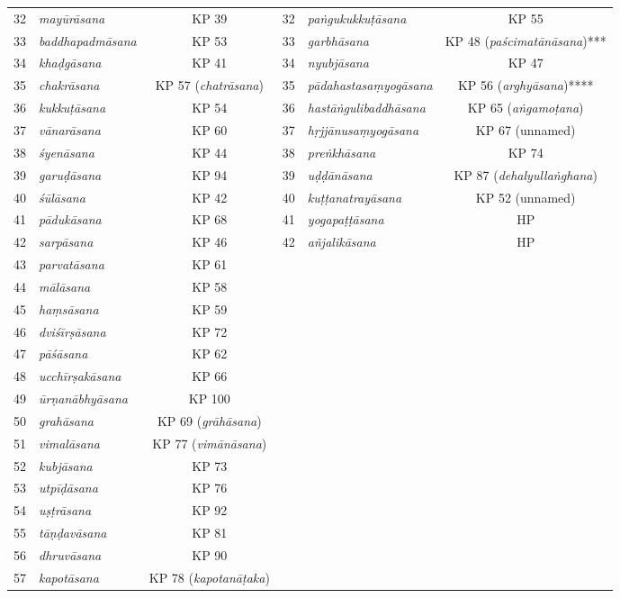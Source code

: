 \begin{longtable}{clcclc}
32 & \emph{mayūrāsana} & KP 39 & 32 & \emph{paṅgukukkuṭāsana} & KP 55 \\
33 & \emph{baddhapadmāsana} & KP 53 & 33 & \emph{garbhāsana} & KP 48 (\emph{paścimatānāsana})*** \\
34 & \emph{khaḍgāsana} & KP 41 & 34 & \emph{nyubjāsana} & KP 47 \\
35 & \emph{chakrāsana} & KP 57 (\emph{chatrāsana}) & 35 & \emph{pādahastasaṃyogāsana} & KP 56 (\emph{arghyāsana})**** \\
36 & \emph{kukkuṭāsana} & KP 54 & 36 & \emph{hastāṅgulibaddhāsana} & KP 65 (\emph{aṅgamoṭana}) \\
37 & \emph{vānarāsana} & KP 60 & 37 & \emph{hṛjjānusaṃyogāsana} & KP 67 (unnamed) \\
38 & \emph{śyenāsana} & KP 44 & 38 & \emph{preṅkhāsana} & KP 74 \\
39 & \emph{garuḍāsana} & KP 94 & 39 & \emph{uḍḍānāsana} & KP 87 (\emph{dehalyullaṅghana}) \\
40 & \emph{śūlāsana} & KP 42 & 40 & \emph{kuṭṭanatrayāsana} & KP 52 (unnamed) \\
41 & \emph{pādukāsana} & KP 68 & 41 & \emph{yogapaṭṭāsana} & HP \\
42 & \emph{sarpāsana} & KP 46 & 42 & \emph{añjalikāsana} & HP \\
43 & \emph{parvatāsana} & KP 61 & & & \\
44 & \emph{mālāsana} & KP 58 & & & \\
45 & \emph{haṃsāsana} & KP 59 & & & \\
46 & \emph{dviśīrṣāsana} & KP 72 & & & \\
47 & \emph{pāśāsana} & KP 62 & & & \\
48 & \emph{ucchīrṣakāsana} & KP 66 & & & \\
49 & \emph{ūrṇanābhyāsana} & KP 100 & & & \\
50 & \emph{grahāsana} & KP 69 (\emph{grāhāsana}) & & & \\
51 & \emph{vimalāsana} & KP 77 (\emph{vimānāsana}) & & & \\
52 & \emph{kubjāsana} & KP 73 & & & \\
53 & \emph{utpīḍāsana} & KP 76 & & & \\
54 & \emph{uṣṭrāsana} & KP 92 & & & \\
55 & \emph{tāṇḍavāsana} & KP 81 & & & \\
56 & \emph{dhruvāsana} & KP 90 & & & \\
57 & \emph{kapotāsana} & KP 78 (\emph{kapotanāṭaka}) & & & \\

\end{longtable}
